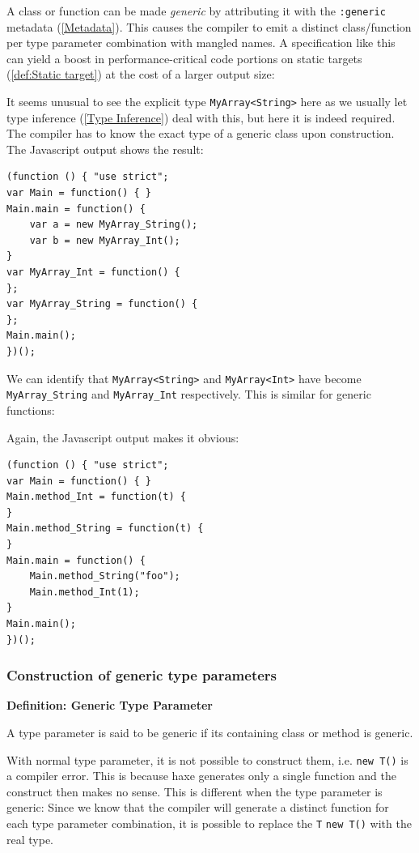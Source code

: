 \documentclass{article}
\newcommand{\target}[1]{#1}
\newcommand{\type}[1]{\texttt{#1}}
\newcommand{\expr}[1]{\texttt{#1}}
\newenvironment{myshaded}
  {\def\FrameCommand{\fboxsep=\topsep\colorbox{bgcolor}}%
  \MakeFramed {\advance\hsize-\width \FrameRestore}}%
 {\endMakeFramed}
\newcommand{\define}[3][Definition]
	{\begin{myshaded}\noindent\textbf{#1: #2}\par\nobreak\noindent\ignorespaces#3\label{def:#2}\end{myshaded}}
\newcommand{\tref}[2]{#1 (\ref{#2})}
\begin{document}
A class or function can be made \emph{generic} by attributing it with the \expr{:generic} \tref{metadata}{Metadata}. This causes the compiler to emit a distinct class/function per type parameter combination with mangled names. A specification like this can yield a boost in performance-critical code portions on \tref{static targets}{def:Static target} at the cost of a larger output size:



It seems unusual to see the explicit type \type{MyArray<String>} here as we usually let \tref{type inference}{Type Inference} deal with this, but here it is indeed required. The compiler has to know the exact type of a generic class upon construction. The \target{Javascript} output shows the result:

\begin{lstlisting}
(function () { "use strict";
var Main = function() { }
Main.main = function() {
	var a = new MyArray_String();
	var b = new MyArray_Int();
}
var MyArray_Int = function() {
};
var MyArray_String = function() {
};
Main.main();
})();
\end{lstlisting}

We can identify that \type{MyArray<String>} and \type{MyArray<Int>} have become \type{MyArray_String} and \type{MyArray_Int} respectively. This is similar for generic functions:



Again, the \target{Javascript} output makes it obvious:

\begin{lstlisting}
(function () { "use strict";
var Main = function() { }
Main.method_Int = function(t) {
}
Main.method_String = function(t) {
}
Main.main = function() {
	Main.method_String("foo");
	Main.method_Int(1);
}
Main.main();
})();
\end{lstlisting}


\subsubsection{Construction of generic type parameters}
\label{Construction of generic type parameters}

\define{Generic Type Parameter}{A type parameter is said to be generic if its containing class or method is generic.}

With normal type parameter, it is not possible to construct them, i.e. \expr{new T()} is a compiler error. This is because haxe generates only a single function and the construct then makes no sense. This is different when the type parameter is generic: Since we know that the compiler will generate a distinct function for each type parameter combination, it is possible to replace the \type{T} \expr{new T()} with the real type.
\end{document}
